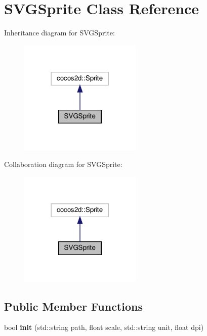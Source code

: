 \hypertarget{classSVGSprite}{}\section{S\+V\+G\+Sprite Class Reference}
\label{classSVGSprite}


Inheritance diagram for S\+V\+G\+Sprite\+:
\nopagebreak
\begin{figure}[H]
\begin{center}
\leavevmode
\includegraphics[width=165pt]{classSVGSprite__inherit__graph}
\end{center}
\end{figure}


Collaboration diagram for S\+V\+G\+Sprite\+:
\nopagebreak
\begin{figure}[H]
\begin{center}
\leavevmode
\includegraphics[width=165pt]{classSVGSprite__coll__graph}
\end{center}
\end{figure}
\subsection*{Public Member Functions}
\begin{DoxyCompactItemize}
\item 
\mbox{\label{classSVGSprite_a30e9014eaa6808072e51e3703da393b8}} 
bool {\bfseries init} (std\+::string path, float scale, std\+::string unit, float dpi)
\end{DoxyCompactItemize}
